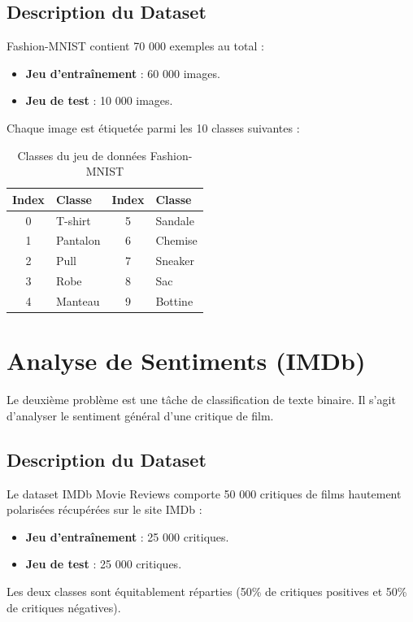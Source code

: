 \documentclass[12pt,a4paper,oneside]{report}
\begin{document}
\subsection{Description du Dataset}
Fashion-MNIST contient 70 000 exemples au total :
\begin{itemize}
    \item \textbf{Jeu d'entraînement} : 60 000 images.
    \item \textbf{Jeu de test} : 10 000 images.
\end{itemize}
Chaque image est étiquetée parmi les 10 classes suivantes :
\begin{table}[H]
    \centering
    \caption{Classes du jeu de données Fashion-MNIST}
    \begin{tabular}{clcl}
        \toprule
        Index & Classe & Index & Classe \\
        \midrule
        0 & T-shirt & 5 & Sandale \\
        1 & Pantalon & 6 & Chemise \\
        2 & Pull & 7 & Sneaker \\
        3 & Robe & 8 & Sac \\
        4 & Manteau & 9 & Bottine \\
        \bottomrule
    \end{tabular}
    \label{tab:fashion_classes}
\end{table}

\section{Analyse de Sentiments (IMDb)}
Le deuxième problème est une tâche de classification de texte binaire. Il s'agit d'analyser le sentiment général d'une critique de film.

\subsection{Description du Dataset}
Le dataset IMDb Movie Reviews comporte 50 000 critiques de films hautement polarisées récupérées sur le site IMDb :
\begin{itemize}
    \item \textbf{Jeu d'entraînement} : 25 000 critiques.
    \item \textbf{Jeu de test} : 25 000 critiques.
\end{itemize}
Les deux classes sont équitablement réparties (50\% de critiques positives et 50\% de critiques négatives).
\end{document}
